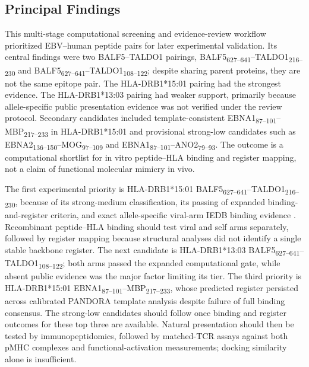 \documentclass[11pt]{article}
\newcommand{\pep}[2]{#1\textsubscript{#2}}
\begin{document}
\subsection{Principal Findings}
This multi-stage computational screening and evidence-review workflow prioritized EBV--human peptide pairs for later experimental validation. Its central findings were two BALF5--TALDO1 pairings, \pep{BALF5}{627--641}--\pep{TALDO1}{216--230} and \pep{BALF5}{627--641}--\pep{TALDO1}{108--122}; despite sharing parent proteins, they are not the same epitope pair. The HLA-DRB1*15:01 pairing had the strongest evidence. The HLA-DRB1*13:03 pairing had weaker support, primarily because allele-specific public presentation evidence was not verified under the review protocol. Secondary candidates included template-consistent \pep{EBNA1}{87--101}--\pep{MBP}{217--233} in HLA-DRB1*15:01 and provisional strong-low candidates such as \pep{EBNA2}{136--150}--\pep{MOG}{97--109} and \pep{EBNA1}{87--101}--\pep{ANO2}{79--93}. The outcome is a computational shortlist for in vitro peptide--HLA binding and register mapping, not a claim of functional molecular mimicry in vivo.

The first experimental priority is HLA-DRB1*15:01 \pep{BALF5}{627--641}--\pep{TALDO1}{216--230}, because of its strong-medium classification, its passing of expanded binding-and-register criteria, and exact allele-specific viral-arm IEDB binding evidence \cite{iedb,hansen}. Recombinant peptide--HLA binding should test viral and self arms separately, followed by register mapping because structural analyses did not identify a single stable backbone register. The next candidate is HLA-DRB1*13:03 \pep{BALF5}{627--641}--\pep{TALDO1}{108--122}; both arms passed the expanded computational gate, while absent public evidence was the major factor limiting its tier. The third priority is HLA-DRB1*15:01 \pep{EBNA1}{87--101}--\pep{MBP}{217--233}, whose predicted register persisted across calibrated PANDORA template analysis despite failure of full binding consensus. The strong-low candidates should follow once binding and register outcomes for these top three are available. Natural presentation should then be tested by immunopeptidomics, followed by matched-TCR assays against both pMHC complexes and functional-activation measurements; docking similarity alone is insufficient.
\end{document}
